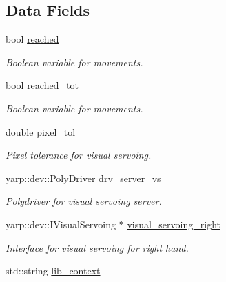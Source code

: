\subsection*{Data Fields}
\begin{DoxyCompactItemize}
\item 
bool \hyperlink{classGraspExecution_a9d964d76db7d1edc7e7d6b195104ad8a}{reached}\label{classGraspExecution_a9d964d76db7d1edc7e7d6b195104ad8a}

\begin{DoxyCompactList}\small\item\em Boolean variable for movements. \end{DoxyCompactList}\item 
bool \hyperlink{classGraspExecution_ae751089ec9badcb4faacf4651da04e30}{reached\+\_\+tot}\label{classGraspExecution_ae751089ec9badcb4faacf4651da04e30}

\begin{DoxyCompactList}\small\item\em Boolean variable for movements. \end{DoxyCompactList}\item 
double \hyperlink{classGraspExecution_ab1d7d4b77784b57f190d523d807264c0}{pixel\+\_\+tol}\label{classGraspExecution_ab1d7d4b77784b57f190d523d807264c0}

\begin{DoxyCompactList}\small\item\em Pixel tolerance for visual servoing. \end{DoxyCompactList}\item 
yarp\+::dev\+::\+Poly\+Driver \hyperlink{classGraspExecution_a38cd56b2b9071773fa6905c6eb94b723}{drv\+\_\+server\+\_\+vs}\label{classGraspExecution_a38cd56b2b9071773fa6905c6eb94b723}

\begin{DoxyCompactList}\small\item\em Polydriver for visual servoing server. \end{DoxyCompactList}\item 
yarp\+::dev\+::\+I\+Visual\+Servoing $\ast$ \hyperlink{classGraspExecution_a3365ea764608f44ce2d949cac7c0c732}{visual\+\_\+servoing\+\_\+right}\label{classGraspExecution_a3365ea764608f44ce2d949cac7c0c732}

\begin{DoxyCompactList}\small\item\em Interface for visual servoing for right hand. \end{DoxyCompactList}\item 
std\+::string \hyperlink{classGraspExecution_a5bffe078460c0f2096d0ffbdc5fec147}{lib\+\_\+context}\label{classGraspExecution_a5bffe078460c0f2096d0ffbdc5fec147}


\end{DoxyCompactItemize}
